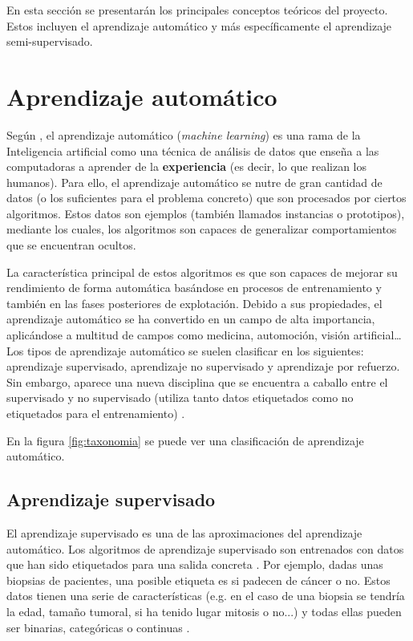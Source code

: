 
En esta sección se presentarán los principales conceptos teóricos del proyecto.
Estos incluyen el aprendizaje automático y más específicamente el aprendizaje
semi-supervisado.

\section{Aprendizaje automático}

Según \cite{intelligent:ml}, el aprendizaje automático (\textit{machine
learning}) es una rama de la Inteligencia artificial como una técnica de
análisis de datos que enseña a las computadoras a aprender de la
\textbf{experiencia} (es decir, lo que realizan los humanos). Para ello, el
aprendizaje automático se nutre de gran cantidad de datos (o los suficientes
para el problema concreto) que son procesados por ciertos algoritmos. Estos
datos son ejemplos (también llamados instancias o prototipos), \cite{pascual:ml}
mediante los cuales, los algoritmos son capaces de generalizar comportamientos
que se encuentran ocultos. 

La característica principal de estos algoritmos es que son capaces de mejorar su
rendimiento de forma automática basándose en procesos de entrenamiento y también
en las fases posteriores de explotación. Debido a sus propiedades, el
aprendizaje automático se ha convertido en un campo de alta importancia,
aplicándose a multitud de campos como medicina, automoción, visión
artificial\ldots Los tipos de aprendizaje automático se suelen clasificar en los
siguientes: aprendizaje supervisado, aprendizaje no supervisado y aprendizaje
por refuerzo. Sin embargo, aparece una nueva disciplina que se encuentra a
caballo entre el supervisado y no supervisado (utiliza tanto datos etiquetados
como no etiquetados para el entrenamiento) \cite{vanEngelen2020}.

En la figura \ref{fig:taxonomia} se puede ver una
clasificación de aprendizaje automático.



\subsection{Aprendizaje supervisado}

El aprendizaje supervisado es una de las aproximaciones del aprendizaje
automático. Los algoritmos de aprendizaje supervisado son entrenados con datos
que han sido etiquetados para una salida concreta \cite{david:sl}. Por ejemplo,
dadas unas biopsias de pacientes, una posible etiqueta es si padecen de cáncer o
no. Estos datos tienen una serie de características (e.g. en el caso de una
biopsia se tendría la edad, tamaño tumoral, si ha tenido lugar mitosis o no...)
y todas ellas pueden ser binarias, categóricas o continuas \cite{salim:sl}.

